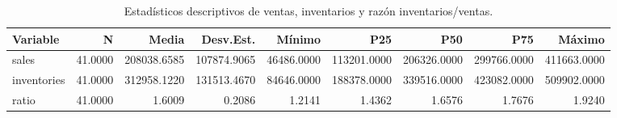 \begin{table}
\caption{Estadísticos descriptivos de ventas, inventarios y razón inventarios/ventas.}
\label{tab:ex8_desc}
\begin{tabular}{lrrrrrrrr}
\toprule
Variable & N & Media & Desv.Est. & Mínimo & P25 & P50 & P75 & Máximo \\
\midrule
sales & 41.0000 & 208038.6585 & 107874.9065 & 46486.0000 & 113201.0000 & 206326.0000 & 299766.0000 & 411663.0000 \\
inventories & 41.0000 & 312958.1220 & 131513.4670 & 84646.0000 & 188378.0000 & 339516.0000 & 423082.0000 & 509902.0000 \\
ratio & 41.0000 & 1.6009 & 0.2086 & 1.2141 & 1.4362 & 1.6576 & 1.7676 & 1.9240 \\
\bottomrule
\end{tabular}
\end{table}
